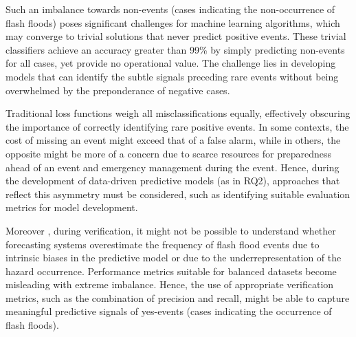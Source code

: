 Such  an imbalance towards non-events (cases indicating the non-occurrence of flash floods) poses significant challenges for machine learning algorithms, which may converge to trivial solutions that never predict positive events. These trivial classifiers achieve an accuracy greater than 99\% by simply predicting non-events for all cases, yet provide no operational value. The challenge lies in developing models that can identify the subtle signals preceding rare events without being overwhelmed by the preponderance of negative cases.

Traditional  loss functions weigh all misclassifications equally, effectively obscuring the importance of correctly identifying rare positive events. In some contexts, the cost of missing an event might exceed that of a false alarm, while in others, the opposite might be more of a concern due to scarce resources for preparedness ahead of an event and emergency management during the event. Hence, during the development of data-driven predictive models (as in RQ2), approaches that reflect this asymmetry must be considered, such as identifying suitable evaluation metrics for model development. 

Moreover , during verification, it might not be possible to understand whether forecasting systems overestimate the frequency of flash flood events due to intrinsic biases in the predictive model or due to the underrepresentation of the hazard occurrence. Performance metrics suitable for balanced datasets become misleading with extreme imbalance. Hence, the use of appropriate verification metrics, such as the combination of precision and recall, might be able to capture meaningful predictive signals of yes-events (cases indicating the occurrence of flash floods).


